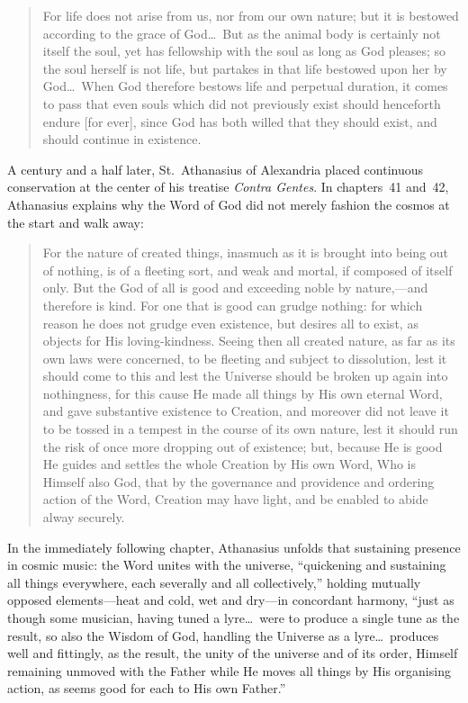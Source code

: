 \begin{quote}
For life does not arise from us, nor from our own nature; but it is bestowed according to the grace of God\dots\ But as the animal body is certainly not itself the soul, yet has fellowship with the soul as long as God pleases; so the soul herself is not life, but partakes in that life bestowed upon her by God\dots\ When God therefore bestows life and perpetual duration, it comes to pass that even souls which did not previously exist should henceforth endure [for ever], since God has both willed that they should exist, and should continue in existence.
\end{quote}

A century and a half later, St.\ Athanasius of Alexandria placed continuous conservation at the center of his treatise \emph{Contra Gentes}. In chapters~41 and~42, Athanasius explains why the Word of God did not merely fashion the cosmos at the start and walk away:

\begin{quote}
For the nature of created things, inasmuch as it is brought into being out of nothing, is of a fleeting sort, and weak and mortal, if composed of itself only. But the God of all is good and exceeding noble by nature,---and therefore is kind. For one that is good can grudge nothing: for which reason he does not grudge even existence, but desires all to exist, as objects for His loving-kindness. Seeing then all created nature, as far as its own laws were concerned, to be fleeting and subject to dissolution, lest it should come to this and lest the Universe should be broken up again into nothingness, for this cause He made all things by His own eternal Word, and gave substantive existence to Creation, and moreover did not leave it to be tossed in a tempest in the course of its own nature, lest it should run the risk of once more dropping out of existence; but, because He is good He guides and settles the whole Creation by His own Word, Who is Himself also God, that by the governance and providence and ordering action of the Word, Creation may have light, and be enabled to abide alway securely.
\end{quote}

In the immediately following chapter, Athanasius unfolds that sustaining presence in cosmic music: the Word unites with the universe, ``quickening and sustaining all things everywhere, each severally and all collectively,'' holding mutually opposed elements---heat and cold, wet and dry---in concordant harmony, ``just as though some musician, having tuned a lyre\dots\ were to produce a single tune as the result, so also the Wisdom of God, handling the Universe as a lyre\dots\ produces well and fittingly, as the result, the unity of the universe and of its order, Himself remaining unmoved with the Father while He moves all things by His organising action, as seems good for each to His own Father.''

